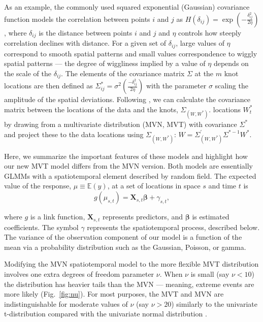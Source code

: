 \documentclass[12pt,english]{article}
\begin{document}
\begin{spacing}{1.9}
As an example, the commonly used squared exponential (Gaussian) covariance function
models the correlation between points $i$ and $j$ as $H(\delta_{ij}) = \exp
\left(-\frac{\delta_{ij}^2}{2 \eta} \right)$, where $\delta_{ij}$ is the
distance between points $i$ and $j$ and $\eta$ controls how steeply
correlation declines with distance. For a given set of $\delta_{ij}$,
large values of $\eta$ correspond to smooth spatial patterns and small values
correspondence to wiggly spatial patterns --- the degree of wiggliness implied by
a value of $\eta$ depends on the scale of the $\delta_{ij}$. The elements of the
covariance matrix $\Sigma$ at the $m$ knot locations are then
defined as $\Sigma_{ij}^*=\sigma^2 \left( \frac{-\delta_{ij}^2}{2 \eta} \right)$ with the
parameter $\sigma$ scaling the amplitude of the spatial deviations.
Following \citet{latimer2009}, we can calculate the
covariance matrix between the locations of the data and the knots,
$\Sigma_{\left(W, W^* \right)}$.
locations $W_t^*$ by drawing from a multivariate distribution (MVN, MVT) with covariance
$\Sigma^*$ and project these to the data locations using
$\Sigma_{\left( W,W^{*} \right)}$:
$W=\Sigma_{\left(W,W^* \right)}^{'} \Sigma^{*-1}W^*$.

Here, we summarize the important features of these models and highlight how
our new MVT model differs from the MVN version. Both models are
essentially GLMMs with a spatiotemporal element described by random field.
The expected value of the response, $\mu
\equiv \mathbb{E}(y)$, at a set of locations in space $s$ and time $t$ is
\begin{equation}
  g(\mu_{s,t}) = \bm{X}_{s,t} \bm{\beta} + \gamma_{s,t},
\end{equation}

\noindent where $g$ is a link function,
$\bm{X}_{s,t}$ represents predictors, and $\bm{\beta}$ is estimated coefficients.
The symbol $\gamma$ represents the spatiotemporal process,
described below. The variance of the observation component of
our model is a function of the mean via a
probability distribution such as the Gaussian, Poisson, or gamma.

Modifying the MVN spatiotemporal model
to the more flexible MVT distribution involves one extra
degrees of freedom parameter $\nu$. When $\nu$ is small (say $\nu < 10$)
the distribution has heavier tails than the MVN --- meaning, extreme events
are more likely (Fig.~\ref{fig:nu}). For most purposes, the MVT and MVN are
indistinguishable for moderate values of $\nu$ (say $\nu > 20$) similarly to the
univariate t-distribution compared with the univariate normal distribution
\citep[e.g.][]{anderson2017}.


\end{spacing}
\end{document}
